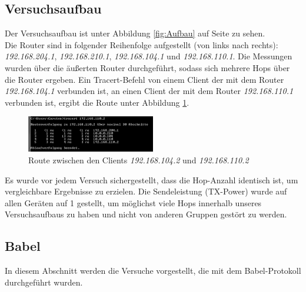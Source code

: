 \documentclass[10pt]{scrartcl}
\begin{document}
\subsection{Versuchsaufbau}
Der Versuchsaufbau ist unter Abbildung \ref{fig:Aufbau} auf Seite \pageref{fig:Aufbau} zu sehen.\\
Die Router sind in folgender Reihenfolge aufgestellt (von links nach rechts): \textit{192.168.204.1}, \textit{192.168.210.1}, \textit{192.168.104.1} und \textit{192.168.110.1}. Die Messungen wurden über die äußerten Router durchgeführt, sodass sich mehrere Hops über die Router ergeben. Ein Tracert-Befehl von einem Client der mit dem Router \textit{192.168.104.1} verbunden ist, an einen Client der mit dem Router \textit{192.168.110.1} verbunden ist, ergibt die Route unter Abbildung \ref{fig:Route}.

\begin{figure}[htbp]
	\centering	\includegraphics[width=0.5\textwidth]{Grafiken/Tracert.png}
	\caption{Route zwischen den Clients \textit{192.168.104.2} und \textit{192.168.110.2}}
	\label{fig:Route}
\end{figure}

Es wurde vor jedem Versuch sichergestellt, dass die Hop-Anzahl identisch ist, um vergleichbare Ergebnisse zu erzielen. Die Sendeleistung (TX-Power) wurde auf allen Geräten auf 1 gestellt, um möglichst viele Hops innerhalb unseres Versuchsaufbaus zu haben und nicht von anderen Gruppen gestört zu werden.

\subsection{Babel}
In diesem Abschnitt werden die Versuche vorgestellt, die mit dem Babel-Protokoll durchgeführt wurden.
\end{document}
